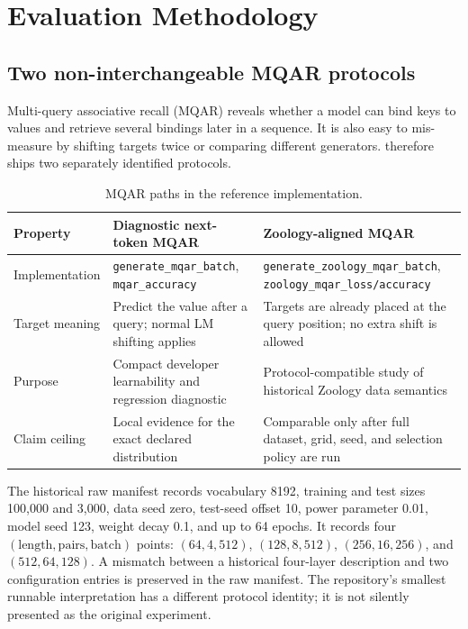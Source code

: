 \section{Evaluation Methodology}
\label{sec:evaluation}

\subsection{Two non-interchangeable MQAR protocols}
\label{sec:mqar-protocols}

Multi-query associative recall (MQAR) reveals whether a model can bind keys to
values and retrieve several bindings later in a sequence. It is also easy to
mis-measure by shifting targets twice or comparing different generators.
\ALUCLU therefore ships two separately identified protocols.

\begin{table}[h]
\centering
\small
\caption{MQAR paths in the reference implementation.}
\label{tab:mqar-protocols}
\begin{tabularx}{\textwidth}{@{}p{}XX@{}}
\toprule
Property & Diagnostic next-token MQAR & Zoology-aligned MQAR \\
\midrule
Implementation &
\texttt{generate\_mqar\_batch}, \texttt{mqar\_accuracy} &
\texttt{generate\_zoology\_mqar\_batch},
\texttt{zoology\_mqar\_loss/accuracy} \\
Target meaning &
Predict the value after a query; normal LM shifting applies &
Targets are already placed at the query position; no extra shift is allowed \\
Purpose &
Compact developer learnability and regression diagnostic &
Protocol-compatible study of historical Zoology data semantics \\
Claim ceiling &
Local evidence for the exact declared distribution &
Comparable only after full dataset, grid, seed, and selection policy are run \\
\bottomrule
\end{tabularx}
\end{table}

The historical raw manifest records vocabulary 8192, training and test sizes
100,000 and 3,000, data seed zero, test-seed offset 10, power parameter 0.01,
model seed 123, weight decay 0.1, and up to 64 epochs. It records four
\((\text{length},\text{pairs},\text{batch})\) points:
\((64,4,512)\), \((128,8,512)\), \((256,16,256)\), and
\((512,64,128)\). A mismatch between a historical four-layer description and
two configuration entries is preserved in the raw manifest. The repository's
smallest runnable interpretation has a different protocol identity; it is not
silently presented as the original experiment.

